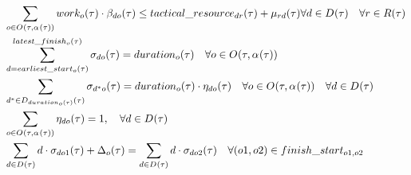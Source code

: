 \begin{alignat}{2}
	& \sum_{\ElementOperation \in \SetOperation{}{\VarStrategicWorkOrderAssignment{}{}}} \ParOperationWork{\ElementOperation} \cdot \VarTacticalWork{\ElementDays}{\ElementOperation} \leq \ParTacticalResource + \VarTacticalExcess \forall \ElementDays \in \SetDays{} \quad \forall r \in \SetResource                                                                                                                                                                                                                 \\ 
	& \sum_{\ElementDays = \ParEarliestStart}^{\ParLatestFinish} \VarTacticalWorkBinary{\ElementDays}{\ElementOperation} = \ParDuration                                                                                                                                 \quad \forall \ElementOperation \in \SetOperation{}{\VarStrategicWorkOrderAssignment{}{}}                                                                                                                                                                                                  \\
	& \sum_{\ElementDays^* \in  \SetDays{\ParDuration}} \VarTacticalWorkBinary{\ElementDays^*}{\ElementOperation}                                                                                                                    = \ParDuration \cdot \VarTacticalWorkBinaryConsecutive                                                                                                                                                                                                        \quad \forall \ElementOperation \in \SetOperation{}{\VarStrategicWorkOrderAssignment{}{}} \quad \forall \ElementDays \in \SetDays{}                                                                                                                                                        \\
	& \sum_{\ElementOperation \in \SetOperation{}{\VarStrategicWorkOrderAssignment{}{}}} \VarTacticalWorkBinaryConsecutive = 1,                                                                                                                                         \quad \forall \ElementDays \in \SetDays{}                                                                                                                                                                                                                                            \notag\\
	& \sum_{\ElementDays \in \SetDays{}} \ElementDays \cdot \VarTacticalWorkBinary{\ElementDays}{\ElementOperation1} + \VarTacticalOperationDifference  = \sum_{\ElementDays \in \SetDays{}} \ElementDays \cdot \VarTacticalWorkBinary{\ElementDays}{\ElementOperation2}  \quad \forall (o1, \ElementOperation2) \in \ParFinishStart                                                                                                                                                                                                                                 \\ 

\end{alignat}
